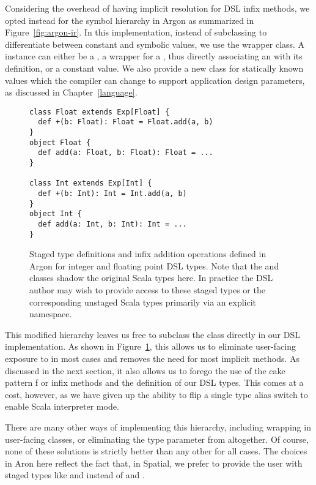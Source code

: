 Considering the overhead of having implicit resolution for DSL infix methods,
we opted instead for the symbol hierarchy in Argon as summarized
in Figure~\ref{fig:argon-ir}. In this implementation, instead of subclassing
 to differentiate between constant and symbolic values, we
use the  wrapper class. A  instance can either
be a , a wrapper for a , thus directly associating
an  with its definition, or a constant  value.
We also provide a new  class for statically known values which
the compiler can change to support application design parameters, as discussed in Chapter~\ref{language}.

\begin{figure}
\begin{lstlisting}[language=ScalaDSL]
class Float extends Exp[Float] {
  def +(b: Float): Float = Float.add(a, b)
}
object Float {
  def add(a: Float, b: Float): Float = ...
}

class Int extends Exp[Int] {
  def +(b: Int): Int = Int.add(a, b)
}
object Int {
  def add(a: Int, b: Int): Int = ...
}
\end{lstlisting}
\caption{Staged type definitions and infix addition operations defined in Argon for integer and floating point DSL types.
Note that the  and  classes shadow the original Scala types here.
In practice the DSL author may wish to provide access to these staged types or the
corresponding unstaged Scala types primarily via an explicit namespace.}
\label{fig:argon-ir-example}
\end{figure}

This modified hierarchy leaves us free to subclass the  class
directly in our DSL implementation. As shown in Figure~\ref{fig:argon-ir-example}, this allows us to eliminate user-facing
exposure to  in most cases and removes the need for most
implicit methods. As discussed in the next section,
it also allows us to forego the use of the cake pattern f
or infix methods and the definition of our DSL types.
This comes at a cost, however, as we have given up the ability to
flip a single type alias switch to enable Scala interpreter mode.

There are many other ways of implementing this hierarchy, including
wrapping  in user-facing classes, or eliminating the
type parameter from  altogether. Of course, none of these solutions
is strictly better than any other for all cases. The choices in Aron here
reflect the fact that, in Spatial, we prefer to provide
the user with staged types like  and  instead of
 and .

